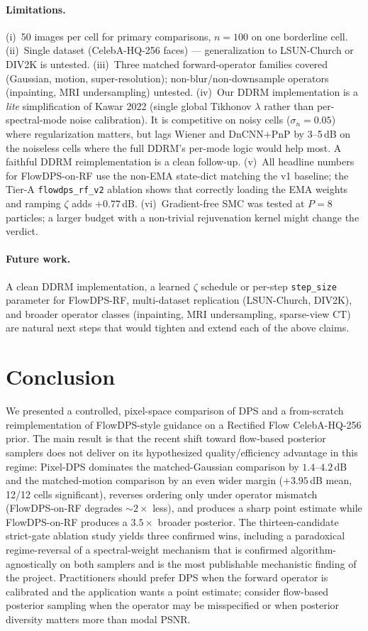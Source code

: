 \documentclass{article}
\begin{document}
\paragraph{Limitations.} (i)~50 images per cell for primary
comparisons, $n{=}100$ on one borderline cell. (ii)~Single dataset
(CelebA-HQ-256 faces) — generalization to LSUN-Church or DIV2K is
untested. (iii)~Three matched forward-operator families covered
(Gaussian, motion, super-resolution); non-blur/non-downsample
operators (inpainting, MRI undersampling) untested.
(iv)~Our DDRM implementation is a \emph{lite} simplification of Kawar
2022 (single global Tikhonov $\lambda$ rather than per-spectral-mode
noise calibration). It is competitive on noisy cells ($\sigma_n{=}0.05$)
where regularization matters, but lags Wiener and DnCNN$+$PnP by
3--5\,dB on the noiseless cells where the full DDRM's per-mode logic
would help most. A faithful DDRM reimplementation is a clean
follow-up. (v)~All headline numbers for FlowDPS-on-RF use the non-EMA
state-dict matching the v1 baseline; the Tier-A
\texttt{flowdps\_rf\_v2} ablation shows that correctly loading the EMA
weights and ramping $\zeta$ adds $+0.77$\,dB. (vi)~Gradient-free SMC
was tested at $P{=}8$ particles; a larger budget with a non-trivial
rejuvenation kernel might change the verdict.

\paragraph{Future work.} A clean DDRM implementation, a learned
$\zeta$ schedule or per-step \texttt{step\_size} parameter for FlowDPS-RF,
multi-dataset replication (LSUN-Church, DIV2K), and broader operator
classes (inpainting, MRI undersampling, sparse-view CT) are natural next steps that
would tighten and extend each of the above claims.

\section{Conclusion}

We presented a controlled, pixel-space comparison of DPS and a
from-scratch reimplementation of FlowDPS-style guidance on a Rectified
Flow CelebA-HQ-256 prior. The main result is that the recent shift
toward flow-based posterior samplers does not deliver on its
hypothesized quality/efficiency advantage in this regime: Pixel-DPS
dominates the matched-Gaussian comparison by $1.4$--$4.2$\,dB and the
matched-motion comparison by an even wider margin ($+3.95$\,dB mean,
12/12 cells significant), reverses ordering only under operator
mismatch (FlowDPS-on-RF degrades $\sim 2\times$ less), and produces a
sharp point estimate while FlowDPS-on-RF produces a $3.5\times$ broader
posterior. The thirteen-candidate strict-gate ablation study yields
three confirmed wins, including a paradoxical regime-reversal of a
spectral-weight mechanism that is confirmed algorithm-agnostically on
both samplers and is the most publishable mechanistic finding of the
project. Practitioners should prefer DPS when the forward operator is
calibrated and the application wants a point estimate; consider
flow-based posterior sampling when the operator may be misspecified or
when posterior diversity matters more than modal PSNR.
\end{document}
